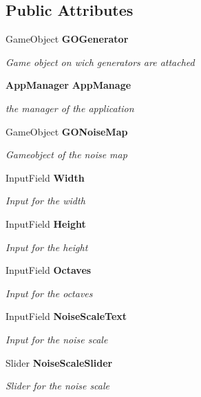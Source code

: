 \subsection*{Public Attributes}
\begin{DoxyCompactItemize}
\item 
Game\+Object \textbf{ G\+O\+Generator}
\begin{DoxyCompactList}\small\item\em Game object on wich generators are attached \end{DoxyCompactList}\item 
\textbf{ App\+Manager} \textbf{ App\+Manage}
\begin{DoxyCompactList}\small\item\em the manager of the application \end{DoxyCompactList}\item 
Game\+Object \textbf{ G\+O\+Noise\+Map}
\begin{DoxyCompactList}\small\item\em Gameobject of the noise map \end{DoxyCompactList}\item 
Input\+Field \textbf{ Width}
\begin{DoxyCompactList}\small\item\em Input for the width \end{DoxyCompactList}\item 
Input\+Field \textbf{ Height}
\begin{DoxyCompactList}\small\item\em Input for the height \end{DoxyCompactList}\item 
Input\+Field \textbf{ Octaves}
\begin{DoxyCompactList}\small\item\em Input for the octaves \end{DoxyCompactList}\item 
Input\+Field \textbf{ Noise\+Scale\+Text}
\begin{DoxyCompactList}\small\item\em Input for the noise scale \end{DoxyCompactList}\item 
Slider \textbf{ Noise\+Scale\+Slider}
\begin{DoxyCompactList}\small\item\em Slider for the noise scale \end{DoxyCompactList}\item 

\end{DoxyCompactItemize}
